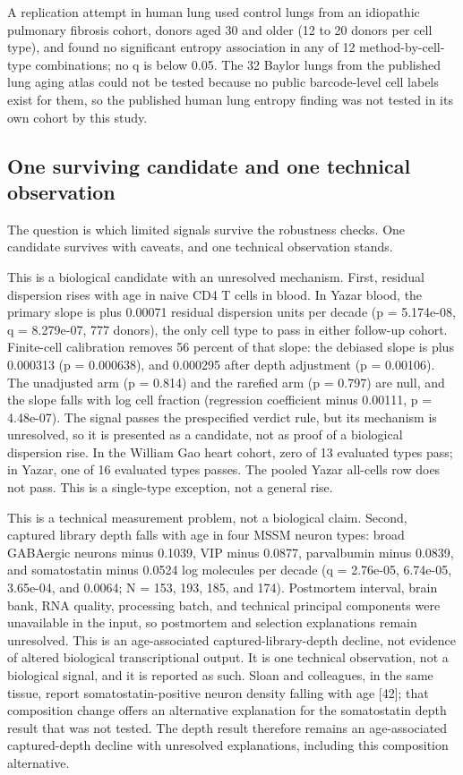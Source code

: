 \documentclass[11pt]{article}
\begin{document}
A replication attempt in human lung used control lungs from an idiopathic pulmonary fibrosis cohort, donors aged 30 and older (12 to 20 donors per cell type), and found no significant entropy association in any of 12 method-by-cell-type combinations; no q is below 0.05. The 32 Baylor lungs from the published lung aging atlas could not be tested because no public barcode-level cell labels exist for them, so the published human lung entropy finding was not tested in its own cohort by this study.


\subsection*{One surviving candidate and one technical observation}

The question is which limited signals survive the robustness checks. One candidate survives with caveats, and one technical observation stands.

This is a biological candidate with an unresolved mechanism. First, residual dispersion rises with age in naive CD4 T cells in blood. In Yazar blood, the primary slope is plus 0.00071 residual dispersion units per decade (p = 5.174e-08, q = 8.279e-07, 777 donors), the only cell type to pass in either follow-up cohort. Finite-cell calibration removes 56 percent of that slope: the debiased slope is plus 0.000313 (p = 0.000638), and 0.000295 after depth adjustment (p = 0.00106). The unadjusted arm (p = 0.814) and the rarefied arm (p = 0.797) are null, and the slope falls with log cell fraction (regression coefficient minus 0.00111, p = 4.48e-07). The signal passes the prespecified verdict rule, but its mechanism is unresolved, so it is presented as a candidate, not as proof of a biological dispersion rise. In the William Gao heart cohort, zero of 13 evaluated types pass; in Yazar, one of 16 evaluated types passes. The pooled Yazar all-cells row does not pass. This is a single-type exception, not a general rise.

This is a technical measurement problem, not a biological claim. Second, captured library depth falls with age in four MSSM neuron types: broad GABAergic neurons minus 0.1039, VIP minus 0.0877, parvalbumin minus 0.0839, and somatostatin minus 0.0524 log molecules per decade (q = 2.76e-05, 6.74e-05, 3.65e-04, and 0.0064; N = 153, 193, 185, and 174). Postmortem interval, brain bank, RNA quality, processing batch, and technical principal components were unavailable in the input, so postmortem and selection explanations remain unresolved. This is an age-associated captured-library-depth decline, not evidence of altered biological transcriptional output. It is one technical observation, not a biological signal, and it is reported as such. Sloan and colleagues, in the same tissue, report somatostatin-positive neuron density falling with age [42]; that composition change offers an alternative explanation for the somatostatin depth result that was not tested. The depth result therefore remains an age-associated captured-depth decline with unresolved explanations, including this composition alternative.
\end{document}
